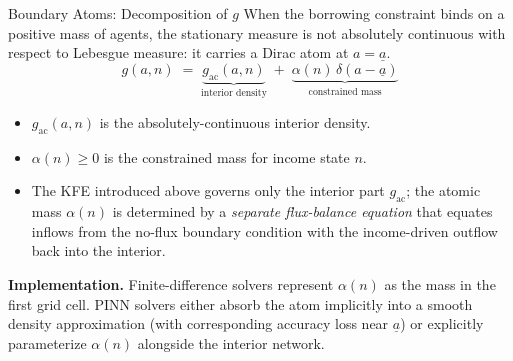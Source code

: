 \documentclass[aspectratio=169,11pt]{beamer}
\newcommand{\emphc}[1]{\textcolor{harvardcrimson}{#1}}
\newcommand{\ubar}[1]{\underline{#1}}
\begin{document}
\begin{frame}{Boundary Atoms: Decomposition of $g$}
\small
When the borrowing constraint binds on a positive mass of agents, the stationary measure is \emphc{not absolutely continuous} with respect to Lebesgue measure: it carries a Dirac atom at $a=\ubar a$.
\[
   \boxed{\,g(a,n) \;=\; \underbrace{g_{\mathrm{ac}}(a,n)}_{\text{interior density}} \;+\; \underbrace{\alpha(n)\,\delta(a-\ubar a)}_{\text{constrained mass}}\,}
\]
\begin{itemize}\itemsep2pt
    \item $g_{\mathrm{ac}}(a,n)$ is the absolutely-continuous interior density.
    \item $\alpha(n)\geq 0$ is the constrained mass for income state $n$.
    \item The KFE introduced above governs only the interior part $g_{\mathrm{ac}}$; the atomic mass $\alpha(n)$ is determined by a \emph{separate flux-balance equation} that equates inflows from the no-flux boundary condition with the income-driven outflow back into the interior.
\end{itemize}

\vspace{0.2em}
{\footnotesize\textbf{Implementation.} Finite-difference solvers represent $\alpha(n)$ as the mass in the first grid cell.  PINN solvers either absorb the atom implicitly into a smooth density approximation (with corresponding accuracy loss near $\ubar a$) or explicitly parameterize $\alpha(n)$ alongside the interior network.}
\end{frame}
\end{document}
